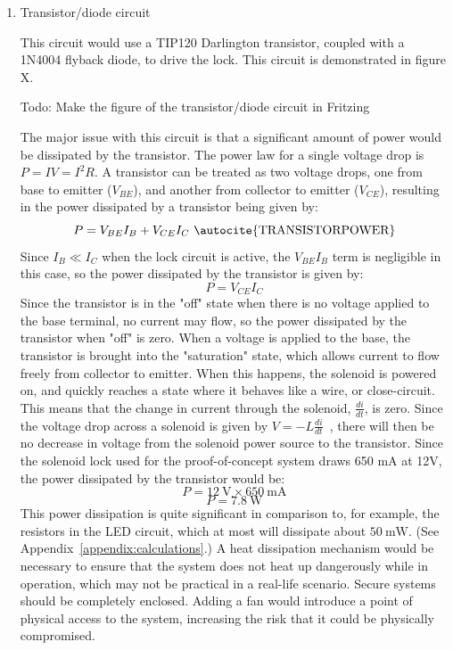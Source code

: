 \documentclass[12pt]{report}
\begin{document}
\begin{enumerate}

\item Transistor/diode circuit

This circuit would use a TIP120 Darlington transistor, coupled with a 1N4004 flyback diode, to drive the lock. This 
circuit is demonstrated in figure X.

Todo: Make the figure of the transistor/diode circuit in Fritzing

The major issue with this circuit is that a significant amount of power would be dissipated by the transistor.
The power law for a single voltage drop is $ P = IV = I^2R $. A transistor can be treated as two voltage drops, one 
from base to emitter ($ V_{BE} $), and another from collector to emitter ($ V_{CE} $), resulting in the power dissipated
by a transistor being given by:
$$ P = V_{BE}I_B + V_{CE}I_C \text{~\autocite{TRANSISTORPOWER}} $$
Since $ I_B \ll I_C $ when the lock circuit is active, the $ V_{BE}I_B $ term is negligible in this case, so the power
dissipated by the transistor is given by:
$$ P = V_{CE}I_C $$
Since the transistor is in the "off" state when there is no voltage applied to the base terminal, no current may flow, 
so the power dissipated by the transistor when "off" is zero. When a voltage is applied to the base, the transistor is 
brought into the "saturation" state, which allows current to flow freely from collector to emitter. When this happens, 
the solenoid is powered on, and quickly reaches a state where it behaves like a wire, or close-circuit. This means that 
the change in current through the solenoid, $ \frac{di}{dt} $, is zero. Since the voltage drop across a solenoid is 
given by $ V = -L\frac{di}{dt} $~\autocite{SOLENOIDVOLTAGE}, there will then be no decrease in voltage from the 
solenoid power source to the transistor. Since the solenoid lock used for the proof-of-concept system draws 650 mA at 
12V, the power dissipated by the transistor would be:
$$ P = \SI{12}{\volt} \times \SI{650}{\milli\ampere} $$
$$ P = \SI{7.8}{\watt} $$
This power dissipation is quite significant in comparison to, for example, the resistors in the LED circuit, which at 
most will dissipate about $\SI{50}{\milli\watt}$. (See Appendix~\ref{appendix:calculations}.) A heat 
dissipation mechanism would be necessary to ensure that the system does not heat up dangerously while in operation, 
which may not be practical in a real-life scenario. Secure systems should be completely enclosed. Adding a fan would 
introduce a point of physical access to the system, increasing the risk that it could be physically compromised.


\end{enumerate}
\end{document}
